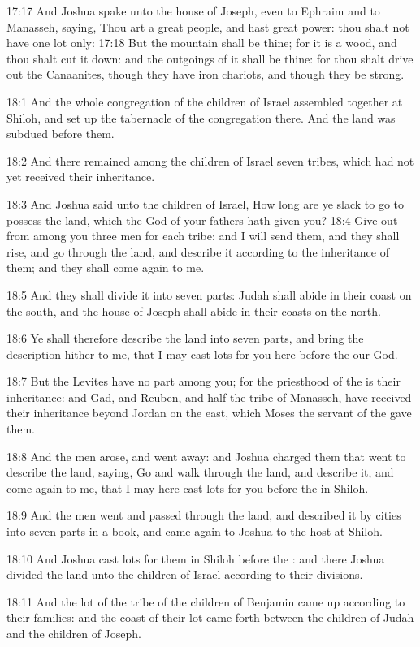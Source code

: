 17:17 And Joshua spake unto the house of Joseph, even to Ephraim and to Manasseh, saying, Thou art a great people, and hast great power: thou shalt not have one lot only: 17:18 But the mountain shall be thine; for it is a wood, and thou shalt cut it down: and the outgoings of it shall be thine: for thou shalt drive out the Canaanites, though they have iron chariots, and though they be strong.

18:1 And the whole congregation of the children of Israel assembled together at Shiloh, and set up the tabernacle of the congregation there. And the land was subdued before them.

18:2 And there remained among the children of Israel seven tribes, which had not yet received their inheritance.

18:3 And Joshua said unto the children of Israel, How long are ye slack to go to possess the land, which the \LORD God of your fathers hath given you?  18:4 Give out from among you three men for each tribe: and I will send them, and they shall rise, and go through the land, and describe it according to the inheritance of them; and they shall come again to me.

18:5 And they shall divide it into seven parts: Judah shall abide in their coast on the south, and the house of Joseph shall abide in their coasts on the north.

18:6 Ye shall therefore describe the land into seven parts, and bring the description hither to me, that I may cast lots for you here before the \LORD our God.

18:7 But the Levites have no part among you; for the priesthood of the \LORD is their inheritance: and Gad, and Reuben, and half the tribe of Manasseh, have received their inheritance beyond Jordan on the east, which Moses the servant of the \LORD gave them.

18:8 And the men arose, and went away: and Joshua charged them that went to describe the land, saying, Go and walk through the land, and describe it, and come again to me, that I may here cast lots for you before the \LORD in Shiloh.

18:9 And the men went and passed through the land, and described it by cities into seven parts in a book, and came again to Joshua to the host at Shiloh.

18:10 And Joshua cast lots for them in Shiloh before the \LORD: and there Joshua divided the land unto the children of Israel according to their divisions.

18:11 And the lot of the tribe of the children of Benjamin came up according to their families: and the coast of their lot came forth between the children of Judah and the children of Joseph.

